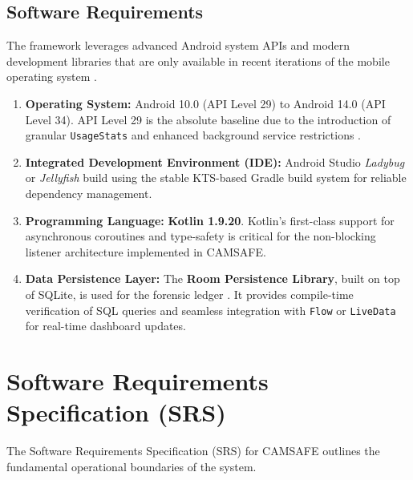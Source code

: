 \documentclass[12pt,a4paper]{report}
\begin{document}
\begin{enumerate}
    \subsection{Software Requirements}
    The framework leverages advanced Android system APIs and modern development libraries that are only available in recent iterations of the mobile operating system \cite{androidhal}.
    \begin{enumerate}
        \item \textbf{Operating System:} Android 10.0 (API Level 29) to Android 14.0 (API Level 34). API Level 29 is the absolute baseline due to the introduction of granular \texttt{UsageStats} and enhanced background service restrictions \cite{androidhal}.
        \item \textbf{Integrated Development Environment (IDE):} Android Studio \textit{Ladybug} or \textit{Jellyfish} build using the stable KTS-based Gradle build system for reliable dependency management.
        \item \textbf{Programming Language:} \textbf{Kotlin 1.9.20}. Kotlin's first-class support for asynchronous coroutines and type-safety is critical for the non-blocking listener architecture implemented in CAMSAFE.
        \item \textbf{Data Persistence Layer:} The \textbf{Room Persistence Library}, built on top of SQLite, is used for the forensic ledger \cite{smarthome}. It provides compile-time verification of SQL queries and seamless integration with \texttt{Flow} or \texttt{LiveData} for real-time dashboard updates.
    \end{enumerate}

    \section{Software Requirements Specification (SRS)}
    The Software Requirements Specification (SRS) for CAMSAFE outlines the fundamental operational boundaries of the system.


\end{enumerate}
\end{document}
